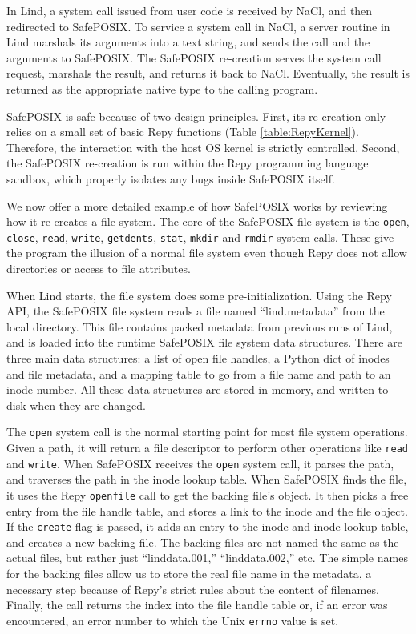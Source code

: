 In Lind, a system call issued from user code is
received by NaCl, and then redirected to SafePOSIX.
To service a system call in NaCl, a server routine in
Lind marshals its arguments into a text string, and sends the call and the arguments
to SafePOSIX. The SafePOSIX re-creation serves the system call request, marshals the result, and
returns it back to NaCl. Eventually, the result is returned as the appropriate
native type to the calling program.

SafePOSIX is safe because of two design principles.
First, its re-creation only relies on a small set of basic Repy functions (Table \ref{table:RepyKernel}).
Therefore, the interaction with the host OS kernel is strictly controlled.
Second, the SafePOSIX re-creation is run within the Repy programming language sandbox,
which properly isolates any bugs inside SafePOSIX itself.

We now offer a more detailed example of how SafePOSIX works by reviewing how it re-creates a file system.
The core of the SafePOSIX file system is the \texttt{open}, \texttt{close}, \texttt{read}, \texttt{write},
\texttt{getdents}, \texttt{stat}, \texttt{mkdir} and \texttt{rmdir} system calls.
These give the program the illusion of a normal file system even though Repy does not allow directories or access to file attributes.

When Lind starts, the file system does some pre-initialization. Using the Repy API, the SafePOSIX file system reads a file named ``lind.metadata''
from the local directory. This file contains packed metadata from previous runs of Lind,
and is loaded into the runtime SafePOSIX file system data structures.
There are three main data structures: a list of open file handles, a Python dict of inodes and file metadata,
and a mapping table to go from a file name and path to an inode number.
All these data structures are stored in memory, and written to disk when they are changed.

The \texttt{open} system call is the normal starting point for most file system operations.
Given a path, it will return a file descriptor to perform other operations like \texttt{read} and \texttt{write}.
When SafePOSIX receives the \texttt{open} system call, it parses the path, and
traverses the path in the inode lookup table.
When SafePOSIX finds the file, it uses the Repy \texttt{openfile} call to get the backing file's object.
It then picks a free entry from the file handle table, and stores a link to the inode and the file object.
If the \texttt{create} flag is passed, it adds an entry to the inode and inode lookup table, and creates a new backing file.
The backing files are not named the same as the actual files, but rather just ``linddata.001,'' ``linddata.002,'' etc.
The simple names for the backing files allow us to store the real file name in the metadata, a
necessary step because of Repy's strict rules about the content of filenames.
Finally, the call returns the index into the file handle table or, if an error was encountered, an error number to which the Unix \texttt{errno} value is set.

